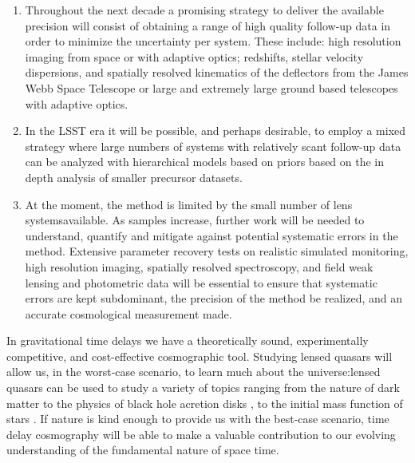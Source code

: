 \begin{enumerate}
\item Throughout the next decade a promising strategy to deliver the
available precision will consist of obtaining a
range of high quality follow-up data in order to minimize the
uncertainty per system. These include: high resolution imaging from
space or with adaptive optics; redshifts, stellar velocity dispersions,
and spatially resolved kinematics of the deflectors from the James Webb
Space Telescope or large and extremely large ground based telescopes with adaptive optics.
\item  In the LSST era it will be possible, and perhaps desirable,  to
employ a mixed strategy where large numbers of systems with relatively
scant follow-up data can be analyzed with hierarchical models based on
priors based on the in depth analysis of smaller precursor datasets.
\item  At the moment, the method is limited by the small number of lens systemsavailable. As samples increase, further work will be needed to understand, quantify and
mitigate against potential systematic errors in the method. Extensive parameter recovery tests on realistic simulated
monitoring, high resolution imaging, spatially resolved spectroscopy,
and field weak lensing and photometric data will be essential to ensure that systematic errors are kept subdominant, the precision of the method be realized, and an accurate cosmological measurement made. 
\end{enumerate}


%
%
In gravitational time delays we have a theoretically sound,
experimentally competitive, and cost-effective cosmographic tool.
%
Studying lensed
quasars will allow us, in the worst-case scenario, to learn much about
the universe:lensed quasars can be used to study a variety of topics
ranging from the nature of dark matter
\citep{Metcalf:2005p1203,Xu++09,Veg++14,Nie++14} to the physics of
black hole acretion disks \citep{PMK08,Blackburne:2010p6600}, to the
initial mass function of stars \citep{Sch++14}. If nature is kind
enough to provide us with the best-case scenario, time delay cosmography
will be able to
make a valuable contribution to our evolving understanding of the
fundamental nature of space time.
